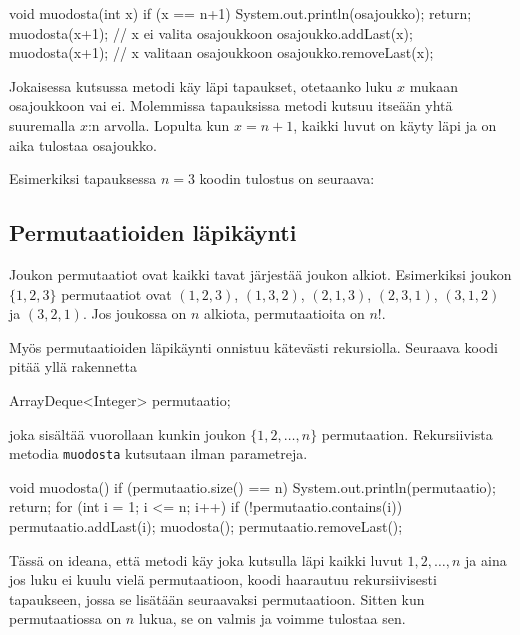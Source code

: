 \begin{code}
void muodosta(int x) {
    if (x == n+1) {
        System.out.println(osajoukko);
        return;
    }
    muodosta(x+1); // x ei valita osajoukkoon
    osajoukko.addLast(x);
    muodosta(x+1); // x valitaan osajoukkoon
    osajoukko.removeLast(x);
}
\end{code}

Jokaisessa kutsussa metodi käy läpi tapaukset,
otetaanko luku $x$ mukaan osajoukkoon vai ei.
Molemmissa tapauksissa metodi kutsuu itseään yhtä
suuremalla $x$:n arvolla.
Lopulta kun $x=n+1$, kaikki luvut on käyty läpi
ja on aika tulostaa osajoukko.

Esimerkiksi tapauksessa $n=3$ koodin tulostus on seuraava:

\begin{code}
[]
[3]
[2]
[2, 3]
[1]
[1, 3]
[1, 2]
[1, 2, 3]
\end{code}

\subsection{Permutaatioiden läpikäynti}

Joukon permutaatiot ovat kaikki tavat järjestää joukon alkiot.
Esimerkiksi joukon $\{1,2,3\}$ permutaatiot ovat
$(1,2,3)$, $(1,3,2)$, $(2,1,3)$, $(2,3,1)$, $(3,1,2)$ ja $(3,2,1)$.
Jos joukossa on $n$ alkiota, permutaatioita on $n!$.

Myös permutaatioiden läpikäynti onnistuu kätevästi rekursiolla.
Seuraava koodi pitää yllä rakennetta

\begin{code}
ArrayDeque<Integer> permutaatio;
\end{code}

joka sisältää vuorollaan kunkin joukon $\{1,2,\dots,n\}$ permutaation.
Rekursiivista metodia \texttt{muodosta} kutsutaan ilman parametreja.

\begin{code}
void muodosta() {
    if (permutaatio.size() == n) {
        System.out.println(permutaatio);
        return;
    }
    for (int i = 1; i <= n; i++) {
        if (!permutaatio.contains(i)) {
            permutaatio.addLast(i);
            muodosta();
            permutaatio.removeLast();
        }
    }
}
\end{code}

Tässä on ideana, että metodi käy joka kutsulla läpi kaikki luvut
$1,2,\dots,n$ ja aina jos luku ei kuulu vielä permutaatioon,
koodi haarautuu rekursiivisesti tapaukseen, jossa se lisätään
seuraavaksi permutaatioon.
Sitten kun permutaatiossa on $n$ lukua, se on valmis ja
voimme tulostaa sen.

